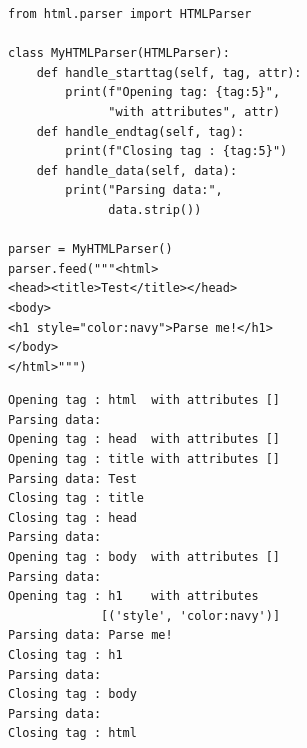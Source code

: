 \begin{frame}[fragile]
%
\begin{tcbraster}[raster columns=2,
                  raster equal height,
                  nobeforeafter,
                  raster column skip=0.1cm]
\begin{codebox}[Example]
\begin{verbatim}
from html.parser import HTMLParser

class MyHTMLParser(HTMLParser):
    def handle_starttag(self, tag, attr):
        print(f"Opening tag: {tag:5}",
              "with attributes", attr)
    def handle_endtag(self, tag):
        print(f"Closing tag : {tag:5}")
    def handle_data(self, data):
        print("Parsing data:", 
              data.strip())

parser = MyHTMLParser()
parser.feed("""<html>
<head><title>Test</title></head>
<body>
<h1 style="color:navy">Parse me!</h1>
</body>
</html>""")
\end{verbatim}
\end{codebox}
%
\begin{cmdbox}[Output]
\begin{verbatim}
Opening tag : html  with attributes []
Parsing data:
Opening tag : head  with attributes []
Opening tag : title with attributes []
Parsing data: Test
Closing tag : title
Closing tag : head 
Parsing data:
Opening tag : body  with attributes []
Parsing data:
Opening tag : h1    with attributes 
             [('style', 'color:navy')]
Parsing data: Parse me!
Closing tag : h1   
Parsing data:
Closing tag : body 
Parsing data:
Closing tag : html
\end{verbatim}
\end{cmdbox}
\end{tcbraster}
%
\end{frame}


